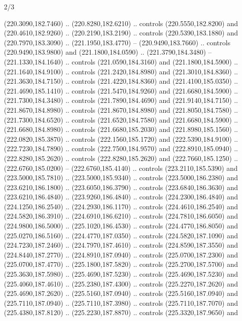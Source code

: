 \begin{flagdescription}{2/3}
\begin{scope}[xshift=0.5\flaglength,yshift=0.5\flagwidth,scale=\flagwidth/259.2]
\begin{scope}[y=0.8pt, x=0.8pt, yscale=-1,shift={(-243,-162)}]
      (220.3090,182.7460) .. (220.8280,182.6210) .. controls (220.5550,182.8200) and
      (220.4610,182.9260) .. (220.2190,183.2190) .. controls (220.5390,183.1880) and
      (220.7970,183.3090) .. (221.1950,183.4770) -- (220.9490,183.7660) .. controls
      (220.9490,183.9800) and (221.1800,184.0590) .. (221.3790,184.3480) --
      (221.1330,184.1640) .. controls (221.0590,184.3160) and (221.1800,184.5900) ..
      (221.1640,184.9100) .. controls (221.2420,184.8980) and (221.3010,184.8360) ..
      (221.3630,184.7150) .. controls (221.4220,184.8360) and (221.4100,185.0350) ..
      (221.4690,185.1410) .. controls (221.5470,184.9260) and (221.6680,184.5900) ..
      (221.7300,184.3480) .. controls (221.7890,184.4690) and (221.9140,184.7150) ..
      (221.8670,184.8980) .. controls (221.8670,184.8980) and (221.8050,184.7580) ..
      (221.7300,184.6520) .. controls (221.6520,184.7580) and (221.6680,184.5900) ..
      (221.6680,184.8980) .. controls (221.6680,185.2030) and (221.8980,185.1560) ..
      (222.0820,185.3870) .. controls (222.1560,185.1720) and (222.5390,184.9100) ..
      (222.7230,184.7890) .. controls (222.7500,184.9570) and (222.8910,185.0940) ..
      (222.8280,185.2620) .. controls (222.8280,185.2620) and (222.7660,185.1250) ..
      (222.6760,185.0200) -- (222.6760,185.4140) .. controls (223.2110,185.5390) and
      (223.5000,185.7810) .. (223.5000,185.9340) .. controls (223.5000,186.2380) and
      (223.6210,186.1800) .. (223.6050,186.3790) .. controls (223.6840,186.3630) and
      (223.6210,186.4840) .. (223.9260,186.4840) .. controls (224.2300,186.4840) and
      (224.1250,186.2540) .. (224.2930,186.1170) .. controls (224.4610,186.2540) and
      (224.5820,186.3910) .. (224.6910,186.6210) .. controls (224.7810,186.6050) and
      (224.9800,186.5000) .. (225.1020,186.4530) .. controls (224.4770,186.8050) and
      (225.0270,186.5160) .. (224.4770,187.0350) .. controls (224.5820,187.1090) and
      (224.7230,187.2460) .. (224.7970,187.4610) .. controls (224.8590,187.3550) and
      (224.8440,187.2770) .. (224.8910,187.0940) .. controls (225.0700,187.2300) and
      (225.0700,187.4770) .. (225.1800,187.5820) .. controls (225.2700,187.5700) and
      (225.3630,187.5980) .. (225.4690,187.5230) .. controls (225.4690,187.5230) and
      (225.4060,187.4610) .. (225.2380,187.4300) .. controls (225.2270,187.2620) and
      (225.4690,187.2620) .. (225.5160,187.0940) .. controls (225.5160,187.0940) and
      (225.7110,187.0940) .. (225.7110,187.3980) .. controls (225.7110,187.7070) and
      (225.4380,187.8120) .. (225.2230,187.8870) .. controls (225.3320,187.9650) and

\end{scope}
\end{scope}
\end{flagdescription}
